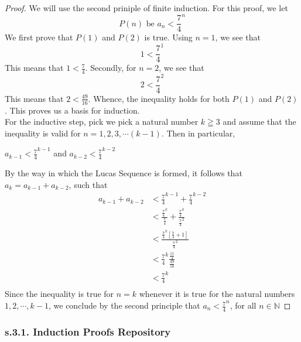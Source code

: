 \begin{example}
\begin{proof}
         We will use the second priniple of finite induction. For this proof, we let
            \begin{equation*}
                P(n) \text{ be } a_n < {\frac{7}{4}}^n            \end{equation*}
        We first prove that $P(1)$ and $P(2)$ is true. Using $n=1$, we see that
            \begin{equation*}
                1 < {\frac{7}{4}}^1
            \end{equation*}
        This means that $1 < \frac{7}{4}$. Secondly, for $n=2$, we see that
            \begin{equation*}
                2 < {\frac{7}{4}}^2
            \end{equation*}
        This means that $2 < \frac{49}{16}$. Whence, the inequality holds for both $P(1)$ and $P(2)$. This proves us a basis for induction. \\ 
        For the inductive step, pick we pick a natural number $k \geqq 3$ and assume that the inequality is valid for $n = 1, 2, 3, \cdots (k-1)$. Then in particular, 
            \begin{center}
                $a_{k-1} < {\frac{7}{4}}^{k-1}$ and $a_{k-2} < {\frac{7}{4}}^{k-2}$
            \end{center}
        By the way in which the Lucas Sequence is formed, it follows that $a_k = a_{k-1} + a_{k-2}$, such that
            \begin{align*}
                a_{k-1} + a_{k-2} & < {\frac{7}{4}}^{k-1} + {\frac{7}{4}}^{k-2} \\
                    & < \frac{{\frac{7}{4}}^k}{\frac{7}{4}} + \frac{{\frac{7}{4}}^k}{{\frac{7}{4}}^2} \\
                    & < \frac{{\frac{7}{4}}^k[\frac{7}{4} + 1]}{{\frac{7}{4}}^2} \\
                    & < {\frac{7}{4}}^k\frac{\frac{11}{4}}{\frac{49}{16}} \\
                    & < {\frac{7}{4}}^k \\
            \end{align*}
        Since the inequality is true for $n=k$ whenever it is true for the natural numbers $1,2, \cdots ,k-1$, we conclude by the second principle that $a_n < {\frac{7}{4}}^n$, for all $n \in \mathbb{N}$
\end{proof}
\end{example}

\newpage
\subsubsection{s.3.1. Induction Proofs Repository}

